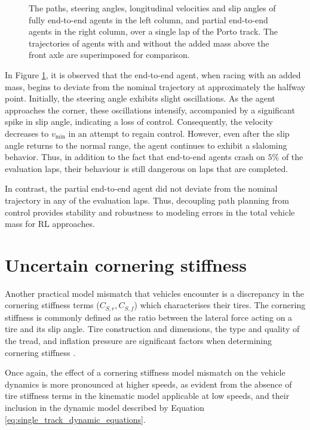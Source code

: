 \begin{figure}[htb!]
    \centering
    
    \caption[Trajectories of agents racing with and without an accounted for mass placed above the front axle]{The paths, steering angles, longitudinal velocities and slip angles of fully end-to-end agents in the left column, and partial end-to-end agents in the right column, over a single lap of the Porto track. The trajectories of agents with and without the added mass above the front axle are superimposed for comparison.}
    \label{fig:unknown_mass_trajs_2}
\end{figure}

In Figure \ref{fig:unknown_mass_trajs_2}, it is observed that the end-to-end agent, when racing with an added mass, begins to deviate from the nominal trajectory at approximately the halfway point. 
Initially, the steering angle exhibits slight oscillations. 
As the agent approaches the corner, these oscillations intensify, accompanied by a significant spike in slip angle, indicating a loss of control. 
Consequently, the velocity decreases to $v_{\text{min}}$ in an attempt to regain control. 
However, even after the slip angle returns to the normal range, the agent continues to exhibit a slaloming behavior.
Thus, in addition to the fact that end-to-end agents crash on $5\%$ of the evaluation laps, their behaviour is still dangerous on laps that are completed.

In contrast, the partial end-to-end agent did not deviate from the nominal trajectory in any of the evaluation laps.
Thus, decoupling path planning from control provides stability and robustness to modeling errors in the total vehicle mass for RL approaches.


\section{Uncertain cornering stiffness}

Another practical model mismatch that vehicles encounter is a discrepancy in the cornering stiffness terms ($C_{S,r}, C_{S,f}$) which characterises their tires.
The cornering stiffness is commonly defined as the ratio between the lateral force acting on a tire and its slip angle. 
Tire construction and dimensions, the type and quality of the tread, and inflation pressure are significant factors when determining cornering stiffness \cite{Vorotovic2013}.

Once again, the effect of a cornering stiffness model mismatch on the vehicle dynamics is more pronounced at higher speeds, as evident from the absence of tire stiffness terms in the kinematic model applicable at low speeds, and their inclusion in the dynamic model described by Equation \ref{eq:single_track_dynamic_equations}.


